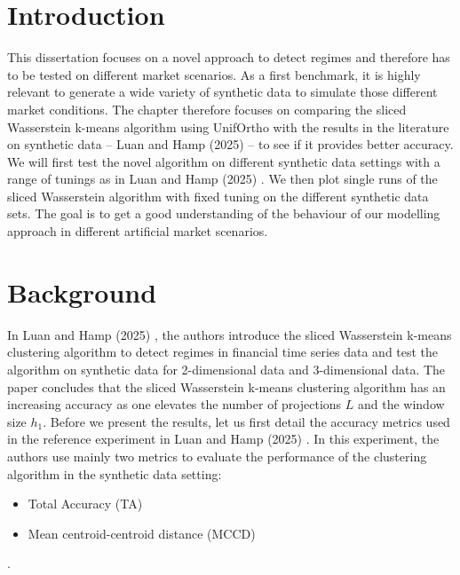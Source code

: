 \documentclass[12pt,a4paper]{report}
\begin{document}
\section{Introduction}
This dissertation focuses on a novel approach to detect regimes and therefore has to be tested on different market scenarios. As a first benchmark, it is highly relevant to generate a wide variety of synthetic data to simulate those different market conditions.
The chapter therefore focuses on comparing the sliced Wasserstein k-means algorithm using UnifOrtho with the results in the literature on synthetic data -- Luan and Hamp (2025) \cite{LuanHamp2025} -- to see if it provides better accuracy.
We will first test the novel algorithm on different synthetic data settings with a range of tunings as in Luan and Hamp (2025) \cite{LuanHamp2025}. 
We then plot single runs of the sliced Wasserstein algorithm with fixed tuning on the different synthetic data sets. The goal is to get 
a good understanding of the behaviour of our modelling approach in different artificial market scenarios.

\section{Background}
In Luan and Hamp (2025) \cite{LuanHamp2025}, the authors introduce the sliced Wasserstein k-means clustering algorithm to detect regimes in financial time series data and test the algorithm on synthetic data for
2-dimensional data and 3-dimensional data.
The paper concludes that the sliced Wasserstein k-means clustering algorithm has an increasing accuracy as one elevates the number of projections $L$ and the window size $h_1$.
Before we present the results, let us first detail the accuracy metrics used in the reference experiment in Luan and Hamp (2025) \cite{LuanHamp2025}.
In this experiment, the authors use mainly two metrics to evaluate the performance of the clustering algorithm in the synthetic data setting:
\begin{itemize}
    \item Total Accuracy (TA)
    \item Mean centroid-centroid distance (MCCD)
\end{itemize}. 
\end{document}
